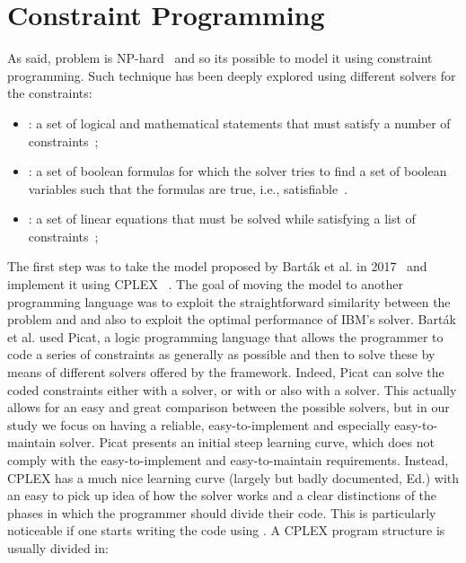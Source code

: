 \section{Constraint Programming}
As said,  problem is NP-hard~\cite{lavalle} and so its possible to
model it using constraint programming. Such technique has been deeply explored
using different solvers for the constraints:
\begin{itemize}
  \item {}: a set of logical and mathematical statements that must
    satisfy a number of constraints~\cite{CSP};
  \item {}: a set of boolean formulas for which the solver tries to
    find a set of boolean variables such that the formulas are true, i.e.,
    satisfiable~\cite{SATSolver}. 
  \item {}: a set of linear equations that must be solved while
    satisfying a list of constraints~\cite{MAPF_overview};
\end{itemize}
The first step was to take the model proposed by Bart\'{a}k et al. in 
2017~\cite{picat1} and implement it using CPLEX ~\cite{OPL}. The goal 
of moving the model to another programming language was to exploit the 
straightforward similarity between the problem and  and also to 
exploit the optimal performance of IBM's solver. \newline
Bart\'{a}k et al. used Picat, a logic programming language that allows the 
programmer to code a series of constraints as generally as possible and then to
solve these by means of different solvers offered by the framework. Indeed,
Picat can solve the coded constraints either with a  solver, or with
 or also with a  solver. This actually allows for an easy
and great comparison between the possible solvers, but in our study we focus
on having a reliable, easy-to-implement and especially easy-to-maintain solver.
Picat presents an initial steep learning curve, which does not comply with the
easy-to-implement and easy-to-maintain requirements. \newline
Instead, CPLEX has a much nice learning curve (largely but badly documented,
Ed.) with an easy to pick up idea of how the solver works and a clear
distinctions of the phases in which the programmer should divide their code.
This is particularly noticeable if one starts writing the code using 
. A CPLEX program structure is usually divided in:
